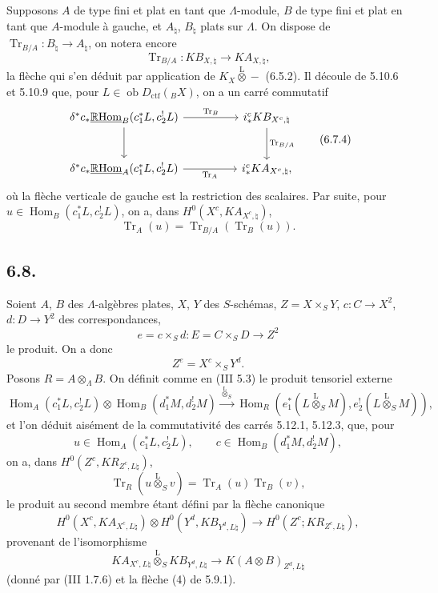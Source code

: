 \documentclass[11pt]{article}
\DeclareMathOperator{\Hom}{Hom}
\newcommand{\R}{\mathbb{R}}\newcommand{\RHomCore}{\mathbb{R}\mathrm{Hom}}
\providecommand{\RHom}{\RHomCore}
\providecommand{\uRHom}{\underline{\RHom}}
\providecommand{\Tr}{\operatorname{Tr}}
\providecommand{\Tr}{\operatorname{Tr}}
\providecommand{\lten}{\overset{\mathrm L}{\otimes}}
\providecommand{\Ob}{\operatorname{ob}}
\providecommand{\Tr}{\operatorname{Tr}}
\providecommand{\RHom}{\RHomCore}
\providecommand{\Hom}{\operatorname{Hom}}
\providecommand{\lten}{\overset{\mathrm L}{\otimes}}
\providecommand{\RHom}{\R\mathcal{H}om}
\providecommand{\lten}{\overset{\mathrm L}{\otimes}}
\providecommand{\Ob}{\operatorname{ob}}
\providecommand{\R}{\mathrm R}
\providecommand{\Tr}{\operatorname{Tr}}
\providecommand{\lten}{\overset{\mathrm L}{\otimes}}
\providecommand{\lten}{\overset{\mathrm L}{\otimes}}
\providecommand{\Ob}{\operatorname{Ob}}
\providecommand{\lten}{\overset{\mathrm L}{\otimes}}
\providecommand{\RHom}{\RHomCore}
\providecommand{\Hom}{\operatorname{Hom}}
\providecommand{\Tr}{\operatorname{Tr}}
\providecommand{\Ob}{\operatorname{ob}}
\providecommand{\Ob}{\operatorname{Ob}}
\providecommand{\lten}{\overset{\mathrm L}{\otimes}}
\begin{document}
Supposons $A$ de type fini et plat en tant que $\Lambda$-module, $B$ de type fini et plat en tant que $A$-module à gauche, et $A_{\natural}$, $B_{\natural}$ plats sur $\Lambda$. On dispose de $\Tr_{B/A}:B_{\natural}\to A_{\natural}$, on notera encore
\begin{equation}
\Tr_{B/A}:KB_{X,\natural}\longrightarrow KA_{X,\natural},
\tag{6.7.3}
\end{equation}
la flèche qui s'en déduit par application de $K_X\lten -$ (6.5.2). Il découle de 5.10.6 et 5.10.9 que, pour $L\in\Ob D_{\mathrm{ctf}}({}_BX)$, on a un carré commutatif
\begin{equation}
\begin{tikzcd}[column sep=huge,row sep=large]
\delta^*c_*\uRHom_B(c_1^*L,c_2^!L) \arrow[r,"\Tr_B"] \arrow[d]
& i_*^cKB_{X^c,\natural} \arrow[d,"\Tr_{B/A}"]\\
\delta^*c_*\uRHom_A(c_1^*L,c_2^!L) \arrow[r,"\Tr_A"']
& i_*^cKA_{X^c,\natural},
\end{tikzcd}
\tag{6.7.4}
\end{equation}
où la flèche verticale de gauche est la restriction des scalaires. Par suite, pour $u\in\Hom_B(c_1^*L,c_2^!L)$, on a, dans $H^0(X^c,KA_{X^c,\natural})$,
\begin{equation}
\Tr_A(u)=\Tr_{B/A}(\Tr_B(u)).
\tag{6.7.5}
\end{equation}

\subsection*{6.8.}
Soient $A$, $B$ des $\Lambda$-algèbres plates, $X$, $Y$ des $S$-schémas, $Z=X\times_SY$, $c:C\to X^2$, $d:D\to Y^2$ des correspondances,
\[
e=c\times_Sd:E=C\times_SD\longrightarrow Z^2
\]
le produit. On a donc
\[
Z^e=X^c\times_SY^d.
\]
Posons $R=A\otimes_{\Lambda}B$. On définit comme en (III 5.3) le produit tensoriel externe
\begin{equation}
\Hom_A(c_1^*L,c_2^!L)\otimes \Hom_B(d_1^*M,d_2^!M)
\xrightarrow{\ \lten_S\ }
\Hom_R(e_1^*(L\lten_SM),e_2^!(L\lten_SM)),
\tag{6.8.1}
\end{equation}
et l'on déduit aisément de la commutativité des carrés 5.12.1, 5.12.3, que, pour
\[
u\in\Hom_A(c_1^*L,c_2^!L),\qquad c\in\Hom_B(d_1^*M,d_2^!M),
\]
on a, dans $H^0(Z^c,KR_{Z^c,L\natural})$,
\begin{equation}
\Tr_R(u\lten_Sv)=\Tr_A(u)\Tr_B(v),
\tag{6.8.2}
\end{equation}
le produit au second membre étant défini par la flèche canonique
\begin{equation}
H^0(X^c,KA_{X^c,L\natural})\otimes
H^0(Y^d,KB_{Y^d,L\natural})
\longrightarrow
H^0(Z^c;KR_{Z^c,L\natural}),
\tag{6.8.3}
\end{equation}
provenant de l'isomorphisme
\[
KA_{X^c,L\natural}\lten_S KB_{Y^d,L\natural}\longrightarrow K(A\otimes B)_{Z^d,L\natural}
\]
(donné par (III 1.7.6) et la flèche (4) de 5.9.1).
\end{document}
